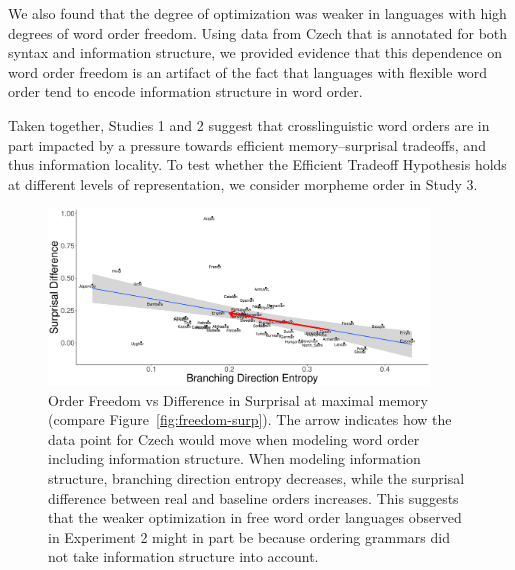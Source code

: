 We also found that the degree of optimization was weaker in languages with high degrees of word order freedom.
Using data from Czech that is annotated for both syntax and information structure, we provided evidence that this dependence on word order freedom is an artifact of the fact that languages with flexible word order tend to encode information structure in word order.

Taken together, Studies 1 and 2 suggest that crosslinguistic word orders are in part impacted by a pressure towards efficient memory--surprisal tradeoffs, and thus information locality.
To test whether the Efficient Tradeoff Hypothesis holds at different levels of representation, we consider morpheme order in Study 3.









\begin{figure}
\includegraphics[width=0.9\textwidth]{figures/surprisal-branching-entropy-REAL-infostruc-invert.pdf}
	\caption{Order Freedom vs Difference in Surprisal at maximal memory (compare Figure~\ref{fig:freedom-surp}). The arrow indicates how the data point for Czech would move when modeling word order including information structure.
	When modeling information structure, branching direction entropy decreases, while the surprisal difference between real and baseline orders increases.
	This suggests that the weaker optimization in free word order languages observed in Experiment 2 might in part be because ordering grammars did not take information structure into account.
	}\label{fig:freedom-mi-with-infostruc}
\end{figure}




